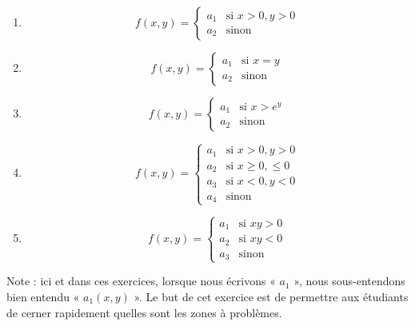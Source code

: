 \begin{exercice}
\begin{multicols}{2}
\begin{enumerate}
	\item
	\begin{equation}
		f(x,y)=
		\begin{cases}
			a_1	&	\text{si }x>0,y>0\\
			a_2	&	 \text{sinon}
		\end{cases}
	\end{equation}
	\item
	\begin{equation}
		f(x,y)=
		\begin{cases}
			a_1	&	\text{si }x=y\\
			a_2	&	 \text{sinon}
		\end{cases}
	\end{equation}
	\item
	\begin{equation}
		f(x,y)=
		\begin{cases}
			a_1	&	\text{si }x>e^y\\
			a_2	&	 \text{sinon}
		\end{cases}
	\end{equation}
	\item
	\begin{equation}
		f(x,y)=
		\begin{cases}
			a_1	&	\text{si }x>0,y>0\\
			a_2	&	 \text{si }x\geq 0,\leq 0\\
			a_3	&	 \text{si }x<0,y<0\\
			a_4	&	 \text{sinon}
		\end{cases}
	\end{equation}
	\item
	\begin{equation}
		f(x,y)=
		\begin{cases}
			a_1	&	\text{si }xy>0\\
			a_2	&	 \text{si }xy<0\\
			a_3	&	 \text{sinon}
		\end{cases}
	\end{equation}
\end{enumerate}
\end{multicols}
Note : ici et dans ces exercices, lorsque nous écrivons « $a_1$ », nous sous-entendons bien entendu « $a_1(x,y)$ ». Le but de cet exercice est de permettre aux étudiants de cerner rapidement quelles sont les zones à problèmes.

\end{exercice}
